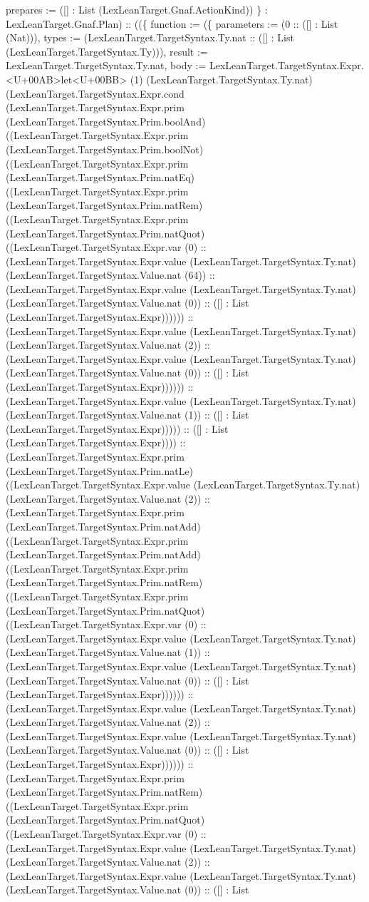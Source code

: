 \documentclass[11pt]{article}
\begin{document}
prepares := ([] : List (LexLeanTarget.Gnaf.ActionKind)) \} : LexLeanTarget.Gnaf.Plan) :: ((\{ function := (\{ parameters := (0 :: ([] : List (Nat))), types := (LexLeanTarget.TargetSyntax.Ty.nat :: ([] : List (LexLeanTarget.TargetSyntax.Ty))), result := LexLeanTarget.TargetSyntax.Ty.nat, body := LexLeanTarget.TargetSyntax.Expr.<U+00AB>let<U+00BB> (1) (LexLeanTarget.TargetSyntax.Ty.nat) (LexLeanTarget.TargetSyntax.Expr.cond (LexLeanTarget.TargetSyntax.Expr.prim (LexLeanTarget.TargetSyntax.Prim.boolAnd) ((LexLeanTarget.TargetSyntax.Expr.prim (LexLeanTarget.TargetSyntax.Prim.boolNot) ((LexLeanTarget.TargetSyntax.Expr.prim (LexLeanTarget.TargetSyntax.Prim.natEq) ((LexLeanTarget.TargetSyntax.Expr.prim (LexLeanTarget.TargetSyntax.Prim.natRem) ((LexLeanTarget.TargetSyntax.Expr.prim (LexLeanTarget.TargetSyntax.Prim.natQuot) ((LexLeanTarget.TargetSyntax.Expr.var (0) :: (LexLeanTarget.TargetSyntax.Expr.value (LexLeanTarget.TargetSyntax.Ty.nat) (LexLeanTarget.TargetSyntax.Value.nat (64)) :: (LexLeanTarget.TargetSyntax.Expr.value (LexLeanTarget.TargetSyntax.Ty.nat) (LexLeanTarget.TargetSyntax.Value.nat (0)) :: ([] : List (LexLeanTarget.TargetSyntax.Expr)))))) :: (LexLeanTarget.TargetSyntax.Expr.value (LexLeanTarget.TargetSyntax.Ty.nat) (LexLeanTarget.TargetSyntax.Value.nat (2)) :: (LexLeanTarget.TargetSyntax.Expr.value (LexLeanTarget.TargetSyntax.Ty.nat) (LexLeanTarget.TargetSyntax.Value.nat (0)) :: ([] : List (LexLeanTarget.TargetSyntax.Expr)))))) :: (LexLeanTarget.TargetSyntax.Expr.value (LexLeanTarget.TargetSyntax.Ty.nat) (LexLeanTarget.TargetSyntax.Value.nat (1)) :: ([] : List (LexLeanTarget.TargetSyntax.Expr))))) :: ([] : List (LexLeanTarget.TargetSyntax.Expr)))) :: (LexLeanTarget.TargetSyntax.Expr.prim (LexLeanTarget.TargetSyntax.Prim.natLe) ((LexLeanTarget.TargetSyntax.Expr.value (LexLeanTarget.TargetSyntax.Ty.nat) (LexLeanTarget.TargetSyntax.Value.nat (2)) :: (LexLeanTarget.TargetSyntax.Expr.prim (LexLeanTarget.TargetSyntax.Prim.natAdd) ((LexLeanTarget.TargetSyntax.Expr.prim (LexLeanTarget.TargetSyntax.Prim.natAdd) ((LexLeanTarget.TargetSyntax.Expr.prim (LexLeanTarget.TargetSyntax.Prim.natRem) ((LexLeanTarget.TargetSyntax.Expr.prim (LexLeanTarget.TargetSyntax.Prim.natQuot) ((LexLeanTarget.TargetSyntax.Expr.var (0) :: (LexLeanTarget.TargetSyntax.Expr.value (LexLeanTarget.TargetSyntax.Ty.nat) (LexLeanTarget.TargetSyntax.Value.nat (1)) :: (LexLeanTarget.TargetSyntax.Expr.value (LexLeanTarget.TargetSyntax.Ty.nat) (LexLeanTarget.TargetSyntax.Value.nat (0)) :: ([] : List (LexLeanTarget.TargetSyntax.Expr)))))) :: (LexLeanTarget.TargetSyntax.Expr.value (LexLeanTarget.TargetSyntax.Ty.nat) (LexLeanTarget.TargetSyntax.Value.nat (2)) :: (LexLeanTarget.TargetSyntax.Expr.value (LexLeanTarget.TargetSyntax.Ty.nat) (LexLeanTarget.TargetSyntax.Value.nat (0)) :: ([] : List (LexLeanTarget.TargetSyntax.Expr)))))) :: (LexLeanTarget.TargetSyntax.Expr.prim (LexLeanTarget.TargetSyntax.Prim.natRem) ((LexLeanTarget.TargetSyntax.Expr.prim (LexLeanTarget.TargetSyntax.Prim.natQuot) ((LexLeanTarget.TargetSyntax.Expr.var (0) :: (LexLeanTarget.TargetSyntax.Expr.value (LexLeanTarget.TargetSyntax.Ty.nat) (LexLeanTarget.TargetSyntax.Value.nat (2)) :: (LexLeanTarget.TargetSyntax.Expr.value (LexLeanTarget.TargetSyntax.Ty.nat) (LexLeanTarget.TargetSyntax.Value.nat (0)) :: ([] : List 
\end{document}
